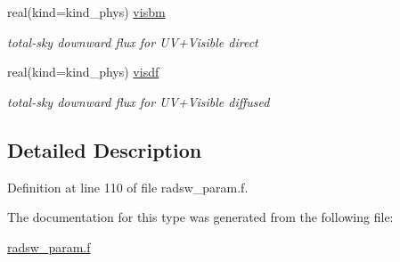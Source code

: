 \begin{DoxyCompactItemize}
real(kind=kind\+\_\+phys) \hyperlink{structmodule__radsw__parameters_1_1cmpfsw__type_aabfae10580f53c63900c74261b1b219c}{visbm}
\begin{DoxyCompactList}\small\item\em total-\/sky downward flux for U\+V+\+Visible direct \end{DoxyCompactList}\item 
\mbox{\label{structmodule__radsw__parameters_1_1cmpfsw__type_a3eb91eab30abc0f1f1bb05c5447cede5}} 
real(kind=kind\+\_\+phys) \hyperlink{structmodule__radsw__parameters_1_1cmpfsw__type_a3eb91eab30abc0f1f1bb05c5447cede5}{visdf}
\begin{DoxyCompactList}\small\item\em total-\/sky downward flux for U\+V+\+Visible diffused \end{DoxyCompactList}\end{DoxyCompactItemize}



\subsection{Detailed Description}


Definition at line 110 of file radsw\+\_\+param.\+f.



The documentation for this type was generated from the following file\+:\begin{DoxyCompactItemize}
\item 
\hyperlink{radsw__param_8f}{radsw\+\_\+param.\+f}\end{DoxyCompactItemize}
